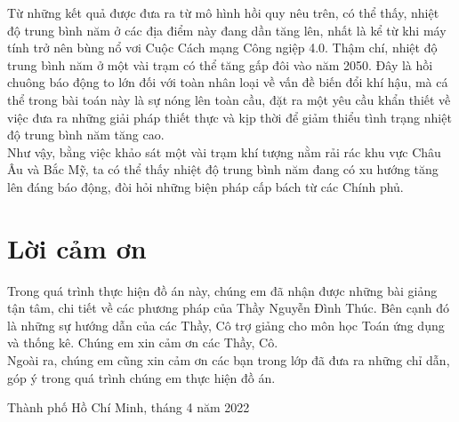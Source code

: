 \documentclass[a4paper]{article}
\begin{document}
Từ những kết quả được đưa ra từ mô hình hồi quy nêu trên, có thể thấy, nhiệt độ trung bình năm ở các địa điểm này đang dần tăng lên, nhất là kể từ khi máy tính trở nên bùng nổ vơi Cuộc Cách mạng Công ngiệp 4.0. Thậm chí, nhiệt độ trung bình năm ở một vài trạm có thể tăng gấp đôi vào năm 2050. Đây là hồi chuông báo động to lớn đối với toàn nhân loại về vấn đề biến đổi khí hậu, mà cá thể trong bài toán này là sự nóng lên toàn cầu, đặt ra một yêu cầu khẩn thiết về việc đưa ra những giải pháp thiết thực và kịp thời để giảm thiểu tình trạng nhiệt độ trung bình năm tăng cao.\\
Như vậy, bằng việc khảo sát một vài trạm khí tượng nằm rải rác khu vực Châu Âu và Bắc Mỹ, ta có thể thấy nhiệt độ trung bình năm đang có xu hướng tăng lên đáng báo động, đòi hỏi những biện pháp cấp bách từ các Chính phủ.
\newpage

\section*{Lời cảm ơn}
Trong quá trình thực hiện đồ án này, chúng em đã nhận được những bài giảng tận tâm, chi tiết về các phương pháp của Thầy Nguyễn Đình Thúc. Bên cạnh đó là những sự hướng dẫn của các Thầy, Cô trợ giảng cho môn học Toán ứng dụng và thống kê. Chúng em xin cảm ơn các Thầy, Cô.\\
Ngoài ra, chúng em cũng xin cảm ơn các bạn trong lớp đã đưa ra những chỉ dẫn, góp ý trong quá trình chúng em thực hiện đồ án.
\begin{flushright}
Thành phố Hồ Chí Minh, tháng 4 năm 2022
\end{flushright} 
\end{document}
